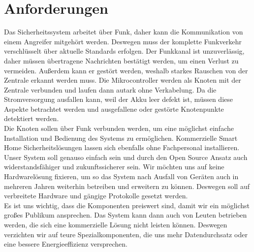 \documentclass[a4paper,10pt,twocolumn]{article}
\begin{document}
\section{Anforderungen}

Das Sicherheitssystem arbeitet über Funk, daher kann die Kommunikation von einem Angreifer mitgehört werden. Deswegen muss der komplette Funkverkehr verschlüsselt über aktuelle Standards erfolgen. Der Funkkanal ist unzuverlässig, daher müssen übertragene Nachrichten bestätigt werden, um einen Verlust zu vermeiden. Außerdem kann er gestört werden, weshalb starkes Rauschen von der Zentrale erkannt werden muss. Die Mikrocontroller werden als Knoten mit der Zentrale verbunden und laufen dann autark ohne Verkabelung. Da die Stromversorgung ausfallen kann, weil der Akku leer defekt ist, müssen diese Aspekte betrachtet werden und ausgefallene oder gestörte Knotenpunkte detektiert werden.\\
Die Knoten sollen über Funk verbunden werden, um eine möglichst einfache Installation und Bedienung des Systems zu ermöglichen. Kommerzielle Smart Home Sicherheitslösungen lassen sich ebenfalls ohne Fachpersonal installieren. Unser System soll genauso einfach sein und durch den Open Source Ansatz auch widerstandsfähiger und zukunftssicherer sein. Wir möchten uns auf keine Hardwarelösung fixieren, um so das System nach Ausfall von Geräten auch in mehreren Jahren weiterhin betreiben und erweitern zu können. Deswegen soll auf verbreitete Hardware und gängige Protokolle gesetzt werden.\\
Es ist uns wichtig, dass die Komponenten preiswert sind, damit wir ein möglichst großes Publikum ansprechen. Das System kann dann auch von Leuten betrieben werden, die sich eine kommerzielle Lösung nicht leisten können. Deswegen verzichten wir auf teure Spezialkomponenten, die uns mehr Datendurchsatz oder eine bessere Energieeffizienz versprechen.
\end{document}
